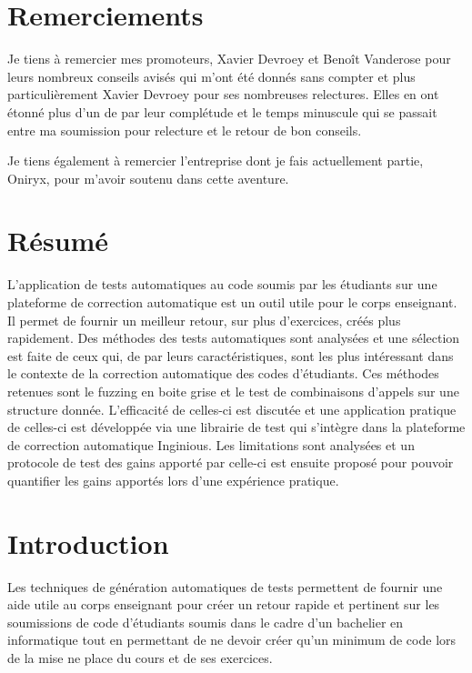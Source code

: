 \documentclass[a4paper]{report}
\begin{document}
\nocite{*}
\chapter*{Remerciements}

Je tiens à remercier mes promoteurs, Xavier Devroey et Benoît Vanderose pour leurs nombreux conseils avisés qui m'ont été donnés sans compter et plus particulièrement Xavier Devroey pour ses nombreuses relectures.
Elles en ont étonné plus d'un de par leur complétude et le temps minuscule qui se passait entre ma soumission pour relecture et le retour de bon conseils.

Je tiens également à remercier l'entreprise dont je fais actuellement partie, Oniryx, pour m'avoir soutenu dans cette aventure.


\chapter*{Résumé}

L'application de tests automatiques au code soumis par les étudiants sur une plateforme de correction automatique est un outil utile pour le corps enseignant.
Il permet de fournir un meilleur retour, sur plus d'exercices, créés plus rapidement.
Des méthodes des tests automatiques sont analysées et une sélection est faite de ceux qui, de par leurs caractéristiques, sont les plus intéressant dans le contexte de la correction automatique des codes d'étudiants.
Ces méthodes retenues sont le fuzzing en boite grise et le test de combinaisons d'appels sur une structure donnée.
L'efficacité de celles-ci est discutée et une application pratique de celles-ci est développée via une librairie de test qui s'intègre dans la plateforme de correction automatique Inginious.
Les limitations sont analysées et un protocole de test des gains apporté par celle-ci est ensuite proposé pour pouvoir quantifier les gains apportés lors d'une expérience pratique.



\tableofcontents

\chapter{Introduction}

Les techniques de génération automatiques de tests permettent de fournir une aide utile au corps enseignant pour créer un retour rapide et pertinent sur les soumissions de code d'étudiants soumis dans le cadre d'un bachelier en informatique tout en permettant de ne devoir créer qu'un minimum de code lors de la mise ne place du cours et de ses exercices.
\end{document}
